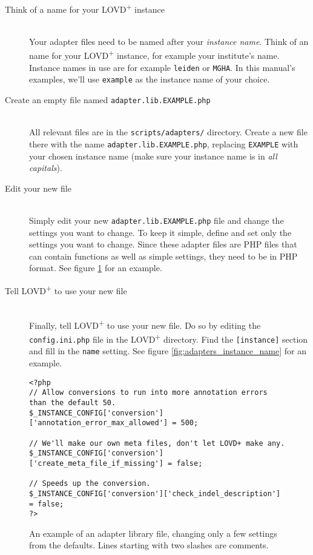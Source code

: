 \begin{description}
  \item[Think of a name for your LOVD\textsuperscript{+} instance] \hfill \\
    Your adapter files need to be named after your \emph{instance name}.
    Think of an name for your LOVD\textsuperscript{+} instance, for example your institute's name.
    Instance names in use are for example \texttt{leiden} or \texttt{MGHA}.
    In this manual's examples, we'll use \texttt{example} as the instance name of your choice.
  \item[Create an empty file named \texttt{adapter.lib.EXAMPLE.php}] \hfill \\
    All relevant files are in the \texttt{scripts/adapters/} directory.
    Create a new file there with the name \texttt{adapter.lib.EXAMPLE.php},
     replacing \texttt{EXAMPLE} with your chosen instance name (make sure your instance name is in \emph{all capitals}).
  \clearpage %
  \item[Edit your new file] \hfill \\
    Simply edit your new \texttt{adapter.lib.EXAMPLE.php} file and change the settings you want to change.
    To keep it simple, define and set only the settings you want to change.
    Since these adapter files are PHP files that can contain functions as well as simple settings,
     they need to be in PHP format.
    See figure \ref{fig:adapters_new_file} for an example.
  \item[Tell LOVD\textsuperscript{+} to use your new file] \hfill \\
    Finally, tell LOVD\textsuperscript{+} to use your new file.
    Do so by editing the \texttt{config.ini.php} file in the LOVD\textsuperscript{+} directory.
    Find the \texttt{[instance]} section and fill in the \texttt{name} setting.
    See figure \ref{fig:adapters_instance_name} for an example.
\end{description}

\begin{figure}[ht]
  \begin{shaded}
    \small
    \begin{verbatim}
<?php
// Allow conversions to run into more annotation errors than the default 50.
$_INSTANCE_CONFIG['conversion']['annotation_error_max_allowed'] = 500;

// We'll make our own meta files, don't let LOVD+ make any.
$_INSTANCE_CONFIG['conversion']['create_meta_file_if_missing'] = false;

// Speeds up the conversion.
$_INSTANCE_CONFIG['conversion']['check_indel_description'] = false;
?>
\end{verbatim}
  \caption{%
    An example of an adapter library file, changing only a few settings from the defaults.
    Lines starting with two slashes are comments.}
    \label{fig:adapters_new_file}
  \end{shaded}
\end{figure}

